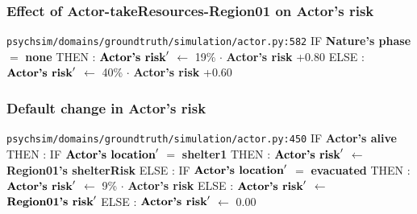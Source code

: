\documentclass{article}%
\begin{document}
%
\subsubsection{Effect of Actor{-}takeResources{-}Region01 on Actor's risk}%
\label{ssubsec:Effect of Actor{-}takeResources{-}Region01 on Actor's risk}%
\begin{flushleft}%
\verb|psychsim/domains/groundtruth/simulation/actor.py:582|%
\linebreak%
IF %
\textbf{Nature's phase}%
$=$%
\textbf{none}%
\linebreak%
\hspace*{2em}%
THEN %
: %
$\mbox{\textbf{Actor's risk}} '$%
$\leftarrow$%
19\%%
$\cdot$%
\textbf{Actor's risk}%
+0.80%
\linebreak%
\hspace*{2em}%
ELSE %
: %
$\mbox{\textbf{Actor's risk}} '$%
$\leftarrow$%
40\%%
$\cdot$%
\textbf{Actor's risk}%
+0.60%
\end{flushleft}

%
\subsubsection{Default change in Actor's risk}%
\label{ssubsec:Default change in Actor's risk}%
\begin{flushleft}%
\verb|psychsim/domains/groundtruth/simulation/actor.py:450|%
\linebreak%
IF %
\textbf{Actor's alive}%
\linebreak%
\hspace*{2em}%
THEN %
: %
IF %
$\mbox{\textbf{Actor's location}} '$%
$=$%
\textbf{shelter1}%
\linebreak%
\hspace*{4em}%
THEN %
: %
$\mbox{\textbf{Actor's risk}} '$%
$\leftarrow$%
\textbf{Region01's shelterRisk}%
\linebreak%
\hspace*{4em}%
ELSE %
: %
IF %
$\mbox{\textbf{Actor's location}} '$%
$=$%
\textbf{evacuated}%
\linebreak%
\hspace*{6em}%
THEN %
: %
$\mbox{\textbf{Actor's risk}} '$%
$\leftarrow$%
9\%%
$\cdot$%
\textbf{Actor's risk}%
\linebreak%
\hspace*{6em}%
ELSE %
: %
$\mbox{\textbf{Actor's risk}} '$%
$\leftarrow$%
$\mbox{\textbf{Region01's risk}} '$%
\linebreak%
\hspace*{2em}%
ELSE %
: %
$\mbox{\textbf{Actor's risk}} '$%
$\leftarrow$%
0.00%
\end{flushleft}
\end{document}
